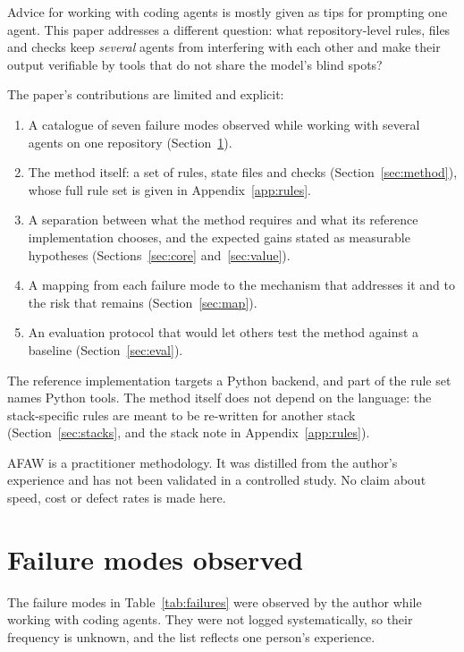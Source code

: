 \documentclass[11pt,a4paper]{article}
\begin{document}
Advice for working with coding agents is mostly given as tips for prompting one agent. This paper addresses a different question: what repository-level rules, files and checks keep \emph{several} agents from interfering with each other and make their output verifiable by tools that do not share the model's blind spots?

The paper's contributions are limited and explicit:
\begin{enumerate}
  \item A catalogue of seven failure modes observed while working with several agents on one repository (Section~\ref{sec:failures}).
  \item The method itself: a set of rules, state files and checks (Section~\ref{sec:method}), whose full rule set is given in Appendix~\ref{app:rules}.
  \item A separation between what the method requires and what its reference implementation chooses, and the expected gains stated as measurable hypotheses (Sections~\ref{sec:core} and~\ref{sec:value}).
  \item A mapping from each failure mode to the mechanism that addresses it and to the risk that remains (Section~\ref{sec:map}).
  \item An evaluation protocol that would let others test the method against a baseline (Section~\ref{sec:eval}).
\end{enumerate}

The reference implementation targets a Python backend, and part of the rule set names Python tools. The method itself does not depend on the language: the stack-specific rules are meant to be re-written for another stack (Section~\ref{sec:stacks}, and the stack note in Appendix~\ref{app:rules}).

AFAW is a practitioner methodology. It was distilled from the author's experience and has not been validated in a controlled study. No claim about speed, cost or defect rates is made here.

\section{Failure modes observed}
\label{sec:failures}

The failure modes in Table~\ref{tab:failures} were observed by the author while working with coding agents. They were not logged systematically, so their frequency is unknown, and the list reflects one person's experience.
\end{document}
